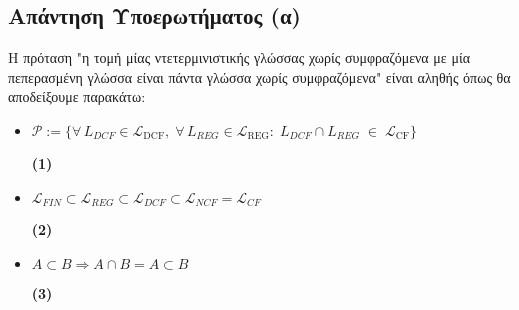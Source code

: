 \subsection{Απάντηση Υποερωτήματος (α)}
\label{ssec:Solution_3.1}
\doublespacing
Η πρόταση "η τομή μίας ντετερμινιστικής γλώσσας χωρίς συμφραζόμενα με μία πεπερασμένη γλώσσα είναι πάντα γλώσσα
χωρίς συμφραζόμενα" είναι αληθής όπως θα αποδείξουμε παρακάτω:


\reducevspace\reducevspace\reducevspace


\begin{tcolorbox}[colback=yellow!15!white, colframe=blue!50!white,
	fonttitle=\bfseries\Large, title = Απόδειξη]
	\centering
\begin{itemize}
	\itemsep0em

	\item $\mathcal{P} := \{\forall\,L_{DCF}\in\mathcal L_{\mathrm{DCF}},\;\forall\,L_{REG}\in\mathcal
	L_{\mathrm{REG}}:\;L_{DCF}\cap L_{REG}\;\in\;\mathcal L_{\mathrm{CF}}\}$
	\reducevspace\reducevspace\reducevspace\reducevspace\reducevspace\reducevspace
	\reducevspace\reducevspace\reducevspace\reducevspace\reducevspace\reducevspace
	\reducevspace\reducevspace\reducevspace\reducevspace\reducevspace\reducevspace
	\reducevspace\reducevspace\reducevspace\reducevspace\reducevspace\reducevspace
	\begin{flushright}\hypertarget{3.1.1}{\bf{(1)}}\end{flushright}


	\item $\mathcal{L}_{FIN} \subset \mathcal{L}_{REG} \subset \mathcal{L}_{DCF} \subset \mathcal{L}_{NCF} =
	\mathcal{L}_{CF}$
	\reducevspace\reducevspace\reducevspace\reducevspace\reducevspace\reducevspace
	\reducevspace\reducevspace\reducevspace\reducevspace\reducevspace\reducevspace
	\reducevspace\reducevspace\reducevspace\reducevspace\reducevspace\reducevspace
	\reducevspace\reducevspace\reducevspace\reducevspace\reducevspace\reducevspace
	\begin{flushright}\hypertarget{3.1.2}{\bf{(2)}}\end{flushright}

	\item $A \subset B \Rightarrow A \cap B = A \subset B$
	\reducevspace\reducevspace\reducevspace\reducevspace\reducevspace\reducevspace
	\reducevspace\reducevspace\reducevspace\reducevspace\reducevspace\reducevspace
	\reducevspace\reducevspace\reducevspace\reducevspace\reducevspace\reducevspace
	\reducevspace\reducevspace\reducevspace\reducevspace\reducevspace\reducevspace
	\begin{flushright}\hypertarget{3.1.3}{\bf{(3)}}\end{flushright}


\end{itemize}
\end{tcolorbox}
